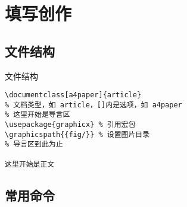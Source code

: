 \section{填写创作}

\subsection{文件结构}

\begin{frame}[fragile]{文件结构}
    \lstset{language=[LaTeX]TeX}
    \begin{lstlisting}[basicstyle=\ttfamily]
\documentclass[a4paper]{article}
% 文档类型，如 article，[]内是选项，如 a4paper
% 这里开始是导言区
\usepackage{graphicx} % 引用宏包
\graphicspath{{fig/}} % 设置图片目录
% 导言区到此为止

这里开始是正文

  \end{lstlisting}
\end{frame}

\subsection{常用命令}
  
